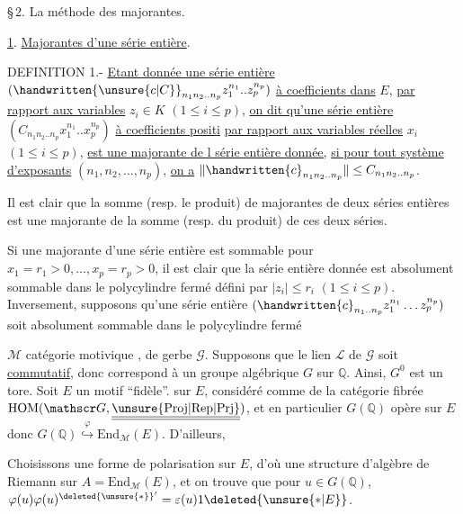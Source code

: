 \S\,2. La méthode des majorantes.

\uline{1}. \uline{Majorantes d'une série entière}.

DEFINITION 1.- \uline{Etant donnée une série entière} $(\handwritten{\unsure{c|C}}_{n_1n_2..n_p}z_1^{n_1}..z_p^{n_p})$ \uline{à coefficients dans} $E$, \uline{par rapport aux variables} $z_i\in K$ $(1\leq i\leq p)$, \uline{on dit qu'une série entière} $(C_{n_1n_2..n_p}x_1^{n_1}..x_p^{n_p})$ \uline{à coefficients positi} \uline{par rapport aux variables réelles} $x_i$ $(1\leq i\leq p)$, \uline{est une majorante de l série entière donnée,} \uline{si pour tout système d'exposants} $(n_1,n_2,\ldots,n_p)$, \uline{on a} $\|\handwritten{c}_{n_1n_2..n_p}\|\leq C_{n_1n_2..n_p}$.

Il est clair que la somme (resp. le produit) de majorantes de deux séries entières est une majorante de la somme (resp. du produit) de ces deux séries.

Si une majorante d'une série entière est sommable pour $x_1=r_1>0,\ldots,x_p=r_p>0$, il est clair que la série entière donnée est absolument somma\unsure{-|{}}ble dans le polycylindre fermé défini par $|z_i|\leq r_i$ $(1\leq i\leq p)$. Inversement, supposons qu'une série entière $(\handwritten{c}_{n_1..n_p}z_1^{n_1}\ldots z_p^{n_p})$ soit absolument sommable dans le polycylindre fermé


$\mathcal M$ catégorie motivique , de gerbe $\mathscr G$. Supposons que le lien $\mathcal L$ de $\mathscr G$ soit \uline{commutatif}, donc correspond à un groupe algébrique  $G$ sur $\mathbb Q$. Ainsi, $G^0$ est un tore. Soit $E$ un motif ``fidèle''.   sur $E$, considéré comme   de la catégorie fibrée $\mathrm{HOM}(\mathscr G,\underline{\underline{\unsure{\mathrm{Proj}|\mathrm{Rep}|\mathrm{Prj}}}})$, et en particulier $G(\mathbb Q)$ opère sur $E$ donc $G(\mathbb Q)\overset{\varphi}{\hookrightarrow}\mathrm{End}_{\mathcal M}(E)$. D'ailleurs,



 Choisissons une forme de polarisation sur $E$, d'où une structure d'algèbre de Riemann sur $A=\mathrm{End}_{\mathcal M}(E)$, et on trouve que pour $u\in G(\mathbb Q)$, $\varphi(u)\varphi(u)^{\deleted{\unsure{*}}'}=\varepsilon(u)1\deleted{\unsure{*|E}}$.

